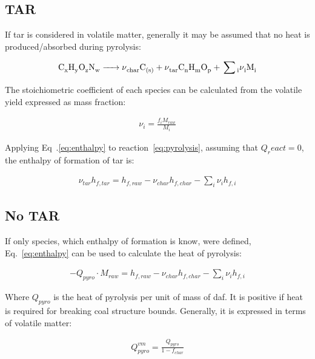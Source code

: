 \documentclass[a4paper]{scrartcl}
\begin{document}
\subsection{TAR}

If tar is considered in volatile matter, generally it may be assumed that no heat is
produced/absorbed during pyrolysis:

\begin{eqnarray}
	\cee{C_x H_y O_z N_w -> \nu_{char}C_{(s)} + \nu_{tar} C_n H_m O_p + \sum_i \nu_i M_i}
	\label{eq:pyrolysis}
\end{eqnarray}

The stoichiometric coefficient of each species can be calculated from the volatile yield expressed
as mass fraction:

\begin{eqnarray}
	\nu_i = \frac{f_i M_{raw}}{M_i}
	\label{eq:stoich}
\end{eqnarray}

Applying Eq~.\eqref{eq:enthalpy} to reaction~\eqref{eq:pyrolysis}, assuming that $Q_react=0$, the
enthalpy of formation of tar is:

\begin{eqnarray}
	\nu_{tar} h_{f,tar} = h_{f,raw} - \nu_{char} h_{f,char} - \sum_i \nu_i h_{f,i}
	\label{eq:enth_tar}
\end{eqnarray}

\subsection{No TAR}

If only species, which enthalpy of formation is know, were defined, Eq.~\eqref{eq:enthalpy} can be
used to calculate the heat of pyrolysis:

\begin{eqnarray}
	- Q_{pyro} \cdot M_{raw} = h_{f,raw} - \nu_{char} h_{f,char} - \sum_i \nu_i h_{f,i}
	\label{eq:qpyro}
\end{eqnarray}

Where $Q_{pyro}$ is the heat of pyrolysis per unit of mass of daf. It is positive if heat is
required for breaking coal structure bounds. Generally, it is expressed in terms of volatile matter:

\begin{eqnarray}
	Q_{pyro}^{vm} = \frac{Q_{pyro}}{1-f_{char}} 
	\label{eq:qpyrovm}
\end{eqnarray}



		
\end{document}
